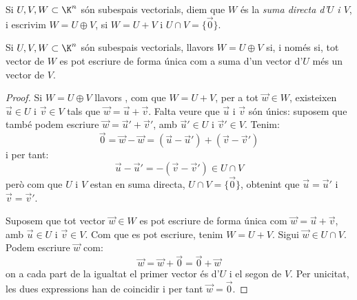 \begin{definicio}
    Si  $U,V,W \subset \K^n$ són subespais vectorials, diem que $W$ és la \emph{ suma directa d'$U$ i $V$}, i escrivim $W=U\oplus V$, si $W=U+V$ i $U\cap V=\{\vec 0\}$.
\end{definicio}
\begin{proposicio}
    Si $U,V,W\subset \K^n$ són subespais vectorials, llavors $W=U\oplus V$ si, i només si, tot vector de $W$ es pot escriure de forma única com a suma d'un vector d'$U$ més un vector de $V$.
\end{proposicio}
\begin{proof}
    Si $W=U\oplus V$ llavors , com que $W=U+V$, per a tot $\vec w\in W$, existeixen $\vec u\in U$ i $\vec v \in V$ tals que $\vec w=\vec u+\vec v$. Falta veure que $\vec u$ i $\vec v$ són únics: suposem que també podem escriure $\vec w=\vec u'+\vec v'$, amb $\vec u'\in U$ i $\vec v'\in V$. Tenim:
    $$
    \vec 0 = \vec w - \vec w = (\vec u-\vec u')+(\vec v-\vec v')
    $$
    i per tant:
    $$
    \vec u-\vec u'=-(\vec v-\vec v') \in U\cap V
    $$
    però com que $U$ i $V$ estan en suma directa, $U\cap V=\{\vec 0\}$, obtenint que $\vec u=\vec u'$ i $\vec v=\vec v'$.
    
    Suposem que tot vector $\vec w \in W$ es pot escriure de forma única com $\vec w=\vec u+\vec v$, amb $\vec u \in U$ i $\vec v \in V$. Com que es pot escriure, tenim $W=U+V$. Sigui $\vec w \in U\cap V$. Podem escriure $\vec w$ com:
    $$
    \vec w = \vec w + \vec 0 = \vec 0 + \vec w
    $$
    on a cada part de la igualtat el primer vector és d'$U$ i el segon de $V$. Per unicitat, les dues expressions han de coincidir i per tant $\vec w = \vec 0$.
\end{proof}
